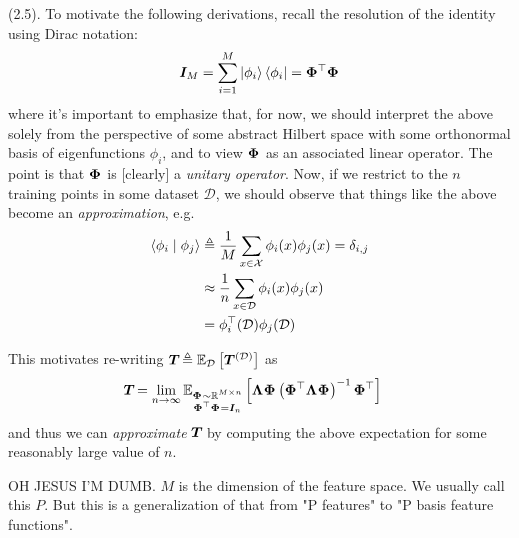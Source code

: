 \documentclass[11pt]{article}
\newcommand\mc{\mathcal}
\begin{document}
 (2.5). To motivate the following derivations, recall the resolution of the identity using Dirac notation:
\begin{align}
	\matr[M]{I} = \sum_{i = 1}^{M} \ket{\phi_i}\bra{\phi_i} = \matr{\Phi}^\top \matr{\Phi}
\end{align}
where it's important to emphasize that, for now, we should interpret the above solely from the perspective of some abstract Hilbert space with some orthonormal basis of eigenfunctions $\phi_i$, and to view $\matr \Phi$ as an associated linear operator. The point is that $\matr \Phi$ is [clearly] a \textit{unitary operator}. Now, if we restrict to the $n$ training points in some dataset $\mc D$, we should observe that things like the above become an \textit{approximation}, e.g. 
\begin{align}
	\braket{\phi_i \mid \phi_j} 
		&\triangleq \inv{M} \sum_{x \in \mc X} \phi_i(x) \phi_j(x) = \delta_{i,j} \\
		&\approx \inv{n} \sum_{x \in \mc D} \phi_i(x) \phi_j(x) \\
		&= \phi_i^\top(\mc D) \phi_j(\mc D)
\end{align}

This motivates re-writing $\matr T \triangleq \E[\mc D]{\matr{T}^{(\mc D)}}$ as 
\begin{align}
	\matr T 
		&= \lim_{n \to \infty} \E[\substack{\matr\Phi \sim \R^{M \times n} \\ \matr{\Phi}^\top \matr{\Phi} = \matr[n]{I}  }]{ \matr\Lambda \matr\Phi \lr{  \matr{\Phi}^\top \matr\Lambda \matr\Phi  }^{-1} \matr{\Phi}^\top   }
\end{align}
and thus we can \textit{approximate} $\matr T$ by computing the above expectation for some reasonably large value of $n$. 



\clearpage 


OH JESUS I'M DUMB. $M$ is the dimension of the feature space. We usually call this $P$. But this is a generalization of that from "P features" to "P basis feature functions". 
\end{document}
